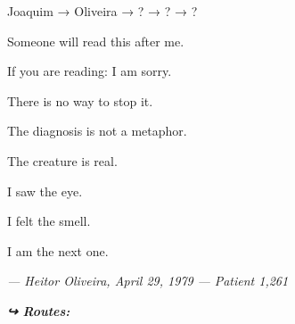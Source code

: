 \noindent Joaquim → Oliveira → ? → ? → ?

\noindent Someone will read this after me.

\noindent If you are reading: I am sorry.

\noindent There is no way to stop it.

\noindent The diagnosis is not a metaphor.

\noindent The creature is real.

\noindent I saw the eye.

\noindent I felt the smell.

\noindent I am the next one.

\noindent \textit{--- Heitor Oliveira, April 29, 1979}
\textit{--- Patient 1,261}

\vspace{0.5em}
\noindent\textit{\textbf{↪ Routes:}  \rotasep {}}
